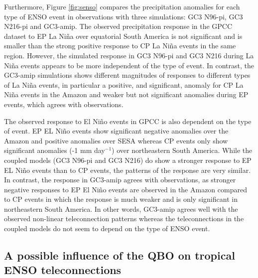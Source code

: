 Furthermore, Figure \ref{fig:senso} compares the precipitation anomalies for each type of ENSO event in observations with three simulations: GC3 N96-pi, GC3 N216-pi and GC3-amip. 
The observed precipitation response in the GPCC dataset to EP La Niña over equatorial South America is not significant and is smaller than the strong positive response to CP La Niña events in the same region. However,  the simulated response in GC3 N96-pi and GC3 N216 during La Niña events appears to be more independent of the type of event. In contrast, the GC3-amip simulations shows different magnitudes of responses to different types of La Niña events, in particular a positive, and significant, anomaly for CP La Niña events in the Amazon and weaker but not significant anomalies during EP events, which agrees with observations.

 The observed response to El Niño events in GPCC is also dependent on the type of event. EP EL Niño events show significant negative anomalies over the Amazon and positive anomalies over SESA whereas CP events only show significant anomalies (-1 mm day$^{-1}$) over northeastern South America. While the coupled models (GC3 N96-pi and GC3 N216) do show a stronger response to EP  EL Niño events than to CP events, the patterns of the response are very similar.
  In contrast, the response in GC3-amip agrees with observations, as stronger negative responses to EP El Niño events are observed in the Amazon compared to CP events in which the response is much weaker and is only significant in northeastern South America. In other words, GC3-amip agrees well with the observed non-linear teleconnection patterns whereas the teleconnections in the coupled models do not seem to depend  on the type of ENSO event.    

\subsection{A possible influence of the QBO on tropical ENSO teleconnections}

